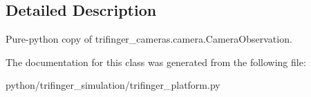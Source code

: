 \subsection{Detailed Description}
Pure-\/python copy of trifinger\+\_\+cameras.\+camera.\+Camera\+Observation. 



The documentation for this class was generated from the following file\+:\begin{DoxyCompactItemize}
\item 
python/trifinger\+\_\+simulation/trifinger\+\_\+platform.\+py\end{DoxyCompactItemize}

